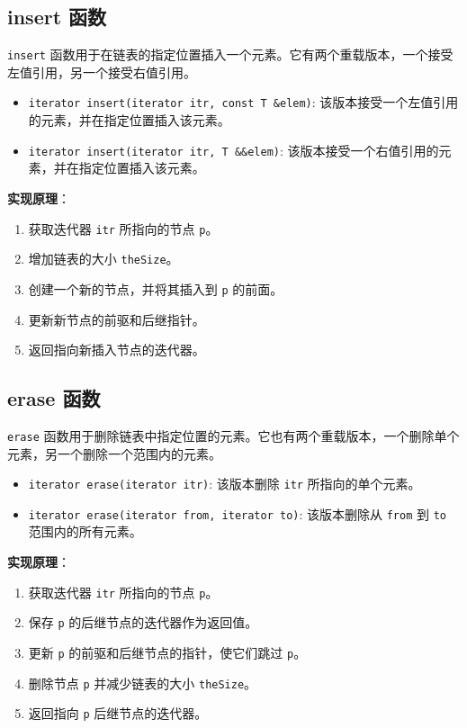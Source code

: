 \documentclass[UTF8]{ctexart}
\begin{document}
\subsection{insert 函数}

\texttt{insert} 函数用于在链表的指定位置插入一个元素。它有两个重载版本，一个接受左值引用，另一个接受右值引用。

\begin{itemize}
  \item \texttt{iterator insert(iterator itr, const T \&elem)}: 该版本接受一个左值引用的元素，并在指定位置插入该元素。
  \item \texttt{iterator insert(iterator itr, T \&\&elem)}: 该版本接受一个右值引用的元素，并在指定位置插入该元素。
\end{itemize}

\textbf{实现原理}：

\begin{enumerate}
  \item 获取迭代器 \texttt{itr} 所指向的节点 \texttt{p}。
  \item 增加链表的大小 \texttt{theSize}。
  \item 创建一个新的节点，并将其插入到 \texttt{p} 的前面。
  \item 更新新节点的前驱和后继指针。
  \item 返回指向新插入节点的迭代器。
\end{enumerate}

\subsection{erase 函数}

\texttt{erase} 函数用于删除链表中指定位置的元素。它也有两个重载版本，一个删除单个元素，另一个删除一个范围内的元素。

\begin{itemize}
  \item \texttt{iterator erase(iterator itr)}: 该版本删除 \texttt{itr} 所指向的单个元素。
  \item \texttt{iterator erase(iterator from, iterator to)}: 该版本删除从 \texttt{from} 到 \texttt{to} 范围内的所有元素。
\end{itemize}

\textbf{实现原理}：

\begin{enumerate}
  \item 获取迭代器 \texttt{itr} 所指向的节点 \texttt{p}。
  \item 保存 \texttt{p} 的后继节点的迭代器作为返回值。
  \item 更新 \texttt{p} 的前驱和后继节点的指针，使它们跳过 \texttt{p}。
  \item 删除节点 \texttt{p} 并减少链表的大小 \texttt{theSize}。
  \item 返回指向 \texttt{p} 后继节点的迭代器。
\end{enumerate}
\end{document}
